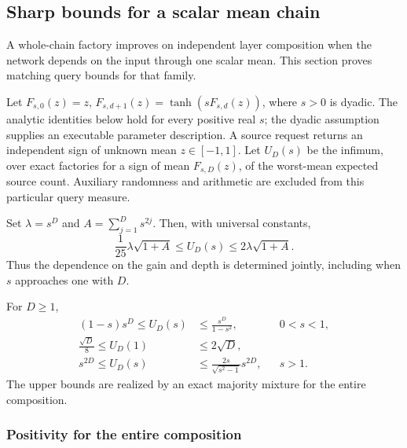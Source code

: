 \subsection{Sharp bounds for a scalar mean chain}\label{sec:wholechain}

A whole-chain factory improves on independent layer composition
when the network depends on the input through one scalar mean.
This section proves matching query bounds for that family.

Let \(F_{s,0}(z)=z\), \(F_{s,d+1}(z)=\tanh(sF_{s,d}(z))\),
where \(s>0\) is dyadic. The analytic identities below hold for
every positive real \(s\); the dyadic assumption supplies an
executable parameter description.
A source request returns an independent sign of
unknown mean \(z\in[-1,1]\).
Let \(U_D(s)\) be the infimum, over exact factories for a sign of
mean \(F_{s,D}(z)\), of the worst-mean expected source count.
Auxiliary randomness and arithmetic are excluded from this
particular query measure.

\begin{theorem}\label{thm:uniformchain}
Set \(\lambda=s^D\) and \(A=\sum_{j=1}^D s^{2j}\).
Then, with universal constants,
\begin{equation}\label{eq:uniformchain}
\frac1{25}\lambda\sqrt{1+A}
\le U_D(s)\le2\lambda\sqrt{1+A}.
\end{equation}
Thus the dependence on the gain and depth is determined jointly,
including when \(s\) approaches one with \(D\).
\end{theorem}

\begin{theorem}\label{thm:chainphase}
For \(D\ge1\),
\begin{align}
(1-s)s^D\le U_D(s)&\le\frac{s^D}{1-s^2},
&&0<s<1,\label{eq:chainsub}\\
\frac{\sqrt D}{8}\le U_D(1)&\le2\sqrt D,\label{eq:chaincritical}\\
s^{2D}\le U_D(s)&\le
\frac{2s}{\sqrt{s^2-1}}s^{2D},
&&s>1.\label{eq:chainsuper}
\end{align}
The upper bounds are realized by an exact majority mixture for
the entire composition.
\end{theorem}

\subsubsection{Positivity for the entire composition}

